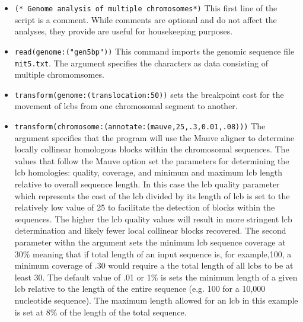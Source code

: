 \begin{itemize}
\item \texttt{(* Genome analysis of multiple chromosomes*)} This first line of the script is a comment. While comments are optional and do not affect the analyses, they provide are useful for housekeeping purposes.
\item \texttt{read(genome:("gen5bp"))} This command imports the genomic sequence file \texttt{mit5.txt}. The argument  specifies the characters as data consisting of multiple chromomsomes.
\item \texttt{transform(genome:(translocation:50))} sets the breakpoint cost for the movement of lcbs from one chromosomal segment to another. 
\item \texttt{transform(chromosome:(annotate:(mauve,25,.3,0.01,.08)))} The argument  specifies that the program will use the Mauve aligner \cite{darlingetal2004} to determine locally collinear homologous blocks within the chromosomal sequences.  The values that follow the Mauve option set the parameters for determining the lcb homologies: quality, coverage, and minimum and maximum lcb length relative to overall sequence length. In this case the lcb quality parameter which represents the cost of the lcb divided by its length of lcb is set to the relatively low value of 25 to facilitate the detection of blocks within the sequences.  The higher the lcb quality values will result in more stringent lcb determination and likely fewer local collinear blocks recovered.  The second parameter withn the argument  sets the minimum lcb sequence coverage at 30\% meaning that if total length of an input sequence is, for example,100, a minimum coverage of .30 would require a the total length of all lcbs to be at least 30. The default value of .01 or 1\% is sets the minimum length of a given lcb relative to the length of the entire sequence (e.g. 100 for a 10,000 nucleotide sequence). The maximum length allowed for an lcb in this example is set at 8\% of the length of the total sequence.

\end{itemize}
